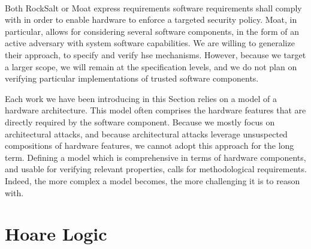 \paragraph{}
%
Both RockSalt or Moat express requirements software requirements shall comply
with in order to enable hardware to enforce a targeted security policy.
%
Moat, in particular, allows for considering several software components, in the
form of an active adversary with system software capabilities.
%
We are willing to generalize their approach, to specify and verify \ac{hse}
mechanisms.
%
However, because we target a larger scope, we will remain at the specification
levels, and we do not plan on verifying particular implementations of trusted
software components.

Each work we have been introducing in this Section relies on a model of a
hardware architecture.
%
This model often comprises the hardware features that are directly required by
the software component.
%
Because we mostly focus on architectural attacks, and because architectural
attacks leverage unsuspected compositions of hardware features, we cannot adopt
this approach for the long term.
%
Defining a model which is comprehensive in terms of hardware components, and
usable for verifying relevant properties, calls for methodological requirements.
%
Indeed, the more complex a model becomes, the more challenging it is to reason
with.

\section{Hoare Logic} %
\label{sec:related:hoare}

